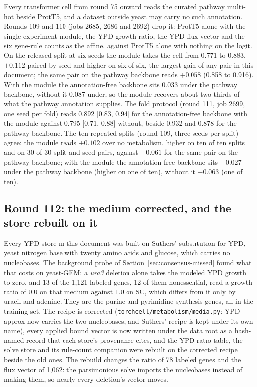 Every transformer cell from round 75 onward reads the curated pathway multi-hot beside
ProtT5, and a dataset outside yeast may carry no such annotation. Rounds 109 and 110 (jobs
2685, 2686 and 2692) drop it: ProtT5 alone with the single-experiment module, the YPD
growth ratio, the YPD flux vector and the six gene-rule counts as the affine, against
ProtT5 alone with nothing on the logit. On the released split at six seeds the module
takes the cell from 0.771 to 0.883, $+0.112$ paired by seed and higher on six of six,
the largest gain of any pair in this document; the same pair on the pathway backbone reads
$+0.058$ (0.858 to 0.916). With the module the annotation-free backbone sits 0.033 under
the pathway backbone, without it 0.087 under, so the module recovers about two thirds of
what the pathway annotation supplies. The fold protocol (round 111, job 2699, one seed per
fold) reads 0.892 [0.83, 0.94] for the annotation-free backbone with the module against
0.795 [0.71, 0.88] without, beside 0.932 and 0.878 for the pathway backbone. The ten repeated splits (round 109, three seeds per
split) agree: the module reads $+0.102$ over no metabolism, higher on ten of ten splits
and on 30 of 30 split-and-seed pairs, against $+0.061$ for the same pair on the pathway
backbone; with the module the annotation-free backbone sits $-0.027$ under the pathway
backbone (higher on one of ten), without it $-0.063$ (one of ten).

\subsection{Round 112: the medium corrected, and the store rebuilt on it}
\label{sec:round112}

Every YPD store in this document was built on Suthers' substitution for YPD, yeast
nitrogen base with twenty amino acids and glucose, which carries no nucleobases. The
background probe of Section~\ref{sec:consensus-missed} found what that costs on
yeast-GEM: a \textit{ura3} deletion alone takes the modeled YPD growth to zero, and 13
of the 1,121 labeled genes, 12 of them nonessential, read a growth ratio of 0.0 on that
medium against 1.0 on SC, which differs from it only by uracil and adenine. They are the
purine and pyrimidine synthesis genes, all in the training set. The recipe is corrected
(\texttt{torchcell/metabolism/media.py}: YPD-approx now carries the two nucleobases, and
Suthers' recipe is kept under its own name), every applied bound vector is now written
under the data root as a hash-named record that each store's provenance cites, and the
YPD ratio table, the solve store and its rule-count companion were rebuilt on the
corrected recipe beside the old ones. The rebuild changes the ratio of 78 labeled genes
and the flux vector of 1,062: the parsimonious solve imports the nucleobases instead of
making them, so nearly every deletion's vector moves.

